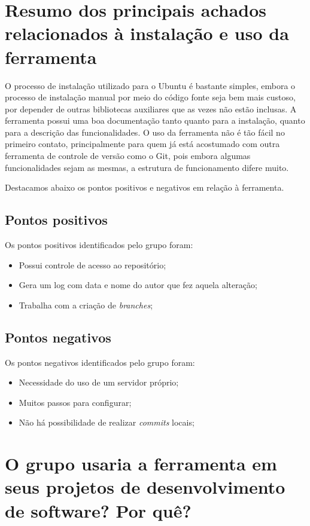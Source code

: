 \section{Resumo dos principais achados relacionados à instalação e uso da ferramenta}

	O processo de instalação utilizado para o Ubuntu é bastante simples, embora o processo de instalação manual por meio do 
	código fonte seja bem mais custoso, por depender de outras bibliotecas auxiliares que as vezes não estão inclusas.
	A ferramenta possui uma boa documentação tanto quanto para a instalação, quanto para a descrição das funcionalidades.
	O uso da ferramenta não é tão fácil no primeiro contato, principalmente para quem já está acostumado com outra ferramenta 
	de controle de versão como o Git, pois embora algumas funcionalidades sejam as mesmas, a estrutura de funcionamento difere muito.

	Destacamos abaixo os pontos positivos e negativos em relação à ferramenta.

	\subsection{Pontos positivos}

			Os pontos positivos identificados pelo grupo foram:

			\begin{itemize}
				\item Possui controle de acesso ao repositório;
				\item Gera um log com data e nome do autor que fez aquela alteração;
				\item Trabalha com a criação de \textit{branches};
			\end{itemize}


	\subsection{Pontos negativos}

			Os pontos negativos identificados pelo grupo foram:

			\begin{itemize}
				\item Necessidade do uso de um servidor próprio;
				\item Muitos passos para configurar;
				\item Não há possibilidade de realizar \textit{commits} locais;
			\end{itemize}

\section{O grupo usaria a ferramenta em seus projetos de desenvolvimento de software? Por quê?}
